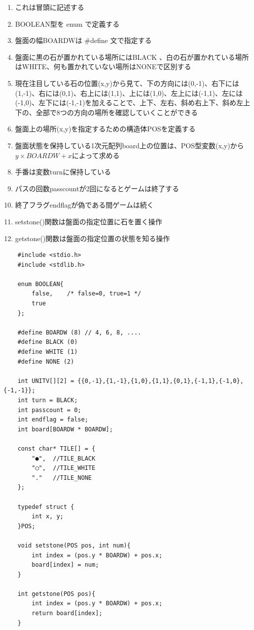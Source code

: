 \documentclass[uplatex,a4paper,11pt,oneside,openany]{jsbook}
\begin{document}
\begin{enumerate}
	\item これは冒頭に記述する
	\item BOOLEAN型を enum で定義する
	\item 盤面の幅BOARDWは \#define 文で指定する
	\item 盤面に黒の石が置かれている場所にはBLACK 、白の石が置かれている場所はWHITE、何も置かれていない場所はNONEで区別する
	\item 現在注目している石の位置(x,y)から見て、下の方向には(0,-1)、右下には(1,-1)、右には(0,1)、右上には(1,1)、上には(1,0)、左上には(-1,1)、左には(-1,0)、左下には(-1,-1)を加えることで、上下、左右、斜め右上下、斜め左上下の、全部で8つの方向の場所を確認していくことができる
	\item 盤面上の場所(x,y)を指定するための構造体POSを定義する
	\item 盤面状態を保持している1次元配列board上の位置は、POS型変数(x,y)から\\$y \times BOARDW +x$によって求める
	\item 手番は変数turnに保持している
	\item パスの回数passcountが2回になるとゲームは終了する
	\item 終了フラグendflagが偽である間ゲームは続く
	\item setstone()関数は盤面の指定位置に石を置く操作
	\item getstone()関数は盤面の指定位置の状態を知る操作
\end{enumerate}

\begin{lstlisting}
	#include <stdio.h>
	#include <stdlib.h>
	
	enum BOOLEAN{
		false,    /* false=0, true=1 */
		true
	};
	
	#define BOARDW (8) // 4, 6, 8, ....
	#define BLACK (0)
	#define WHITE (1)
	#define NONE (2)
	
	int UNITV[][2] = {{0,-1},{1,-1},{1,0},{1,1},{0,1},{-1,1},{-1,0},{-1,-1}};
	int turn = BLACK;
	int passcount = 0;
	int endflag = false;
	int board[BOARDW * BOARDW];
	
	const char* TILE[] = {
		"●",  //TILE_BLACK
		"◯",  //TILE_WHITE
		"."   //TILE_NONE
	};
	
	typedef struct {
		int x, y;
	}POS;
	
	void setstone(POS pos, int num){
		int index = (pos.y * BOARDW) + pos.x;
		board[index] = num;
	}
	
	int getstone(POS pos){
		int index = (pos.y * BOARDW) + pos.x;
		return board[index];
	}
\end{lstlisting}
\end{document}
